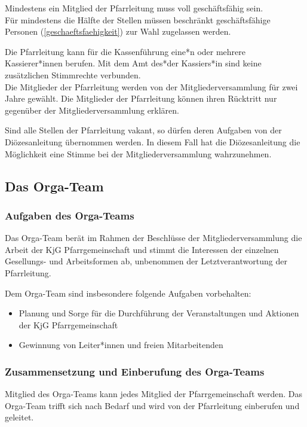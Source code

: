 \documentclass[12pt]{report}
\begin{document}
\begin{justify}
Mindestens ein Mitglied der Pfarrleitung muss voll geschäftsfähig sein.\\
Für mindestens die Hälfte der Stellen müssen beschränkt geschäftsfähige Personen (\ref{geschaeftsfaehigkeit})
zur Wahl zugelassen werden.

Die Pfarrleitung kann für die Kassenführung eine*n oder mehrere Kassierer*innen berufen.
Mit dem Amt des*der Kassiers*in sind keine zusätzlichen Stimmrechte verbunden.\\

Die Mitglieder der Pfarrleitung werden von der Mitgliederversammlung für
zwei Jahre gewählt.
Die Mitglieder der Pfarrleitung können ihren Rücktritt nur
gegenüber der Mitgliederversammlung erklären.

Sind alle Stellen der Pfarrleitung vakant, so dürfen deren Aufgaben von der
Diözesanleitung übernommen werden. In diesem Fall hat die Diözesanleitung die Möglichkeit eine
Stimme bei der Mitgliederversammlung wahrzunehmen.

\subsection{Das Orga-Team}

\subsubsection{Aufgaben des Orga-Teams}

Das Orga-Team berät im Rahmen der Beschlüsse der Mitgliederversammlung die Arbeit der KjG
Pfarrgemeinschaft und stimmt die Interessen der einzelnen Gesellungs- und Arbeitsformen ab,
unbenommen der Letztverantwortung der Pfarrleitung.

Dem Orga-Team sind insbesondere folgende Aufgaben vorbehalten:
\begin{itemize}
  \item Planung und Sorge für die Durchführung der Veranstaltungen und Aktionen der KjG Pfarrgemeinschaft
  \item Gewinnung von Leiter*innen und freien Mitarbeitenden
\end{itemize}

\subsubsection{Zusammensetzung und Einberufung des Orga-Teams}
Mitglied des Orga-Teams kann jedes Mitglied der Pfarrgemeinschaft werden. Das Orga-Team
trifft sich nach Bedarf und wird von der Pfarrleitung einberufen und geleitet.


\end{justify}
\end{document}
